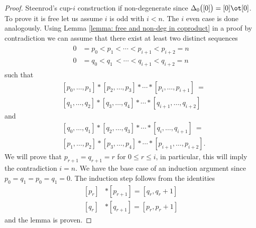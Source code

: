 \begin{proof}
	Steenrod's cup-$i$ construction if non-degenerate since $\Delta_0\big([0]\big) = [0] \ot [0]$. To prove it is free let us assume $i$ is odd with $i < n$. The $i$ even case is done analogously. Using Lemma \ref{lemma: free and non-deg in coproduct} in a proof by contradiction we can assume that there exist at least two distinct sequences
	\begin{align*}
	\begin{split}
	0 &= p_0 < p_1 < \cdots < p_{i+1} < p_{i+2} = n \\
	0 &= q_0 < q_1 \,< \cdots < q_{i+1} < q_{i+2} = n
	\end{split}
	\end{align*}
	such that
	\[
	\begin{split}
	&[ {p_0}, \dots, {p_1} ] \ast [ {p_2}, \dots, {p_3} ] \ast \cdots \ast [ {p_{i}}, \dots, {p_{i+1}} ]\ = \\
	&[ {q_1}, \dots, {q_2} ] \ast [ {q_3}, \dots, {q_4} ] \ast \cdots \ast [ {q_{i+1}}, \dots, {q_{i+2}} ]
	\end{split}
	\]
	and
	\[
	\begin{split}
	&[ {q_0}, \dots, {q_1} ] \ast [ {q_2}, \dots, {q_3} ] \ast \cdots \ast [ {q_{i}}, \dots, {q_{i+1}} ]\ = \\
	&[ {p_1}, \dots, {p_2} ] \ast [ {p_3}, \dots, {p_4} ] \ast \cdots \ast [ {p_{i+1}}, \dots, {p_{i+2}} ].
	\end{split}
	\]
	We will prove that $p_{r+1} = q_{r+1} = r$ for $0 \leq r \leq i$, in particular, this will imply the contradiction $i = n$. We have the base case of an induction argument since ${p_0} = {q_1} = {p_0} = {q_1} = 0$. The induction step follows from the identities
	\[
	\begin{split}
	[p_r] &\ast [p_{r+1}] = [q_r, q_{r}+1]\\
	[q_r] &\ast [q_{r+1}] = [p_r, p_{r}+1]
	\end{split}
	\]
	and the lemma is proven.
\end{proof}